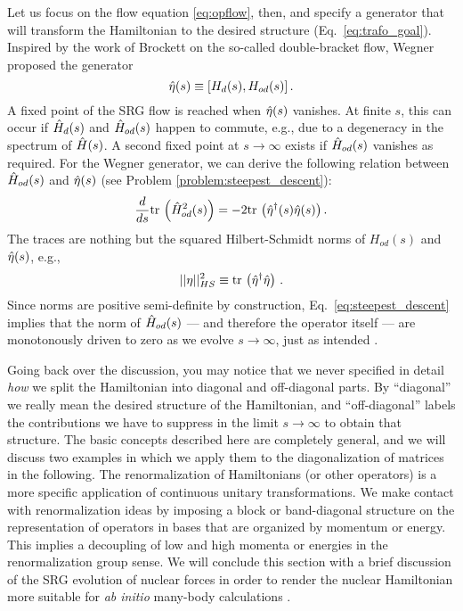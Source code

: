 Let us focus on the flow equation \eqref{eq:opflow}, then, and specify a
generator that will transform the Hamiltonian to the desired structure 
(Eq.~\eqref{eq:trafo_goal}). Inspired by the work of Brockett \cite{Brockett:1991kx} 
on the so-called double-bracket flow, Wegner \cite{Wegner:1994dk} proposed the generator
\begin{equation}\label{eq:def_Wegner_general}
  \etaO(s) \equiv \comm{H_d(s)}{H_{od}(s)}\,.
\end{equation}
A fixed point of the SRG flow is reached when $\hat{\eta}(s)$ vanishes. At finite $s$, this 
can occur if $\hat{H}_d(s)$ and $\hat{H}_{od}(s)$ happen to commute, e.g., due to a degeneracy 
in the spectrum of $\hat{H}(s)$. A second fixed point at $s\to\infty$ exists if $\hat{H}_{od}(s)$ 
vanishes as required. For the Wegner generator, we can derive the following relation
between $\hat{H}_{od}(s)$ and $\hat{\eta}(s)$ (see Problem \ref{problem:steepest_descent}):
\begin{equation} \label{eq:steepest_descent}
  \totd{}{s}\tr\left(\HO^2_{od}(s)\right) = -2 \tr\left(\etaO^\dag(s)\etaO(s)\right).
\end{equation}
The traces are nothing but the squared Hilbert-Schmidt norms of $H_{od}(s)$ and $\hat{\eta}(s)$,
e.g.,
\begin{equation}
  ||\eta||^2_{HS}\equiv\mathrm{tr}\,\left(\hat{\eta}^\dag\hat{\eta}\right)\,.
\end{equation}
Since norms are positive semi-definite by construction, Eq.~\eqref{eq:steepest_descent} 
implies that the norm of $\hat{H}_{od}(s)$ --- and therefore the operator itself --- are monotonously 
driven to zero as we evolve $s\to\infty$, just as intended \cite{Wegner:1994dk,Kehrein:2006kx}.

Going back over the discussion, you may notice that we never specified in
detail \emph{how} we split the Hamiltonian into diagonal and off-diagonal
parts. By ``diagonal'' we really mean the desired structure of the Hamiltonian, 
and ``off-diagonal'' labels the contributions we have to suppress in the
limit $s\to\infty$ to obtain that structure. The basic concepts described
here are completely general, and we will discuss two examples in which we
apply them to the diagonalization of matrices in the following.
The renormalization of Hamiltonians (or other operators) is a more specific 
application of continuous unitary transformations. We make contact with 
renormalization ideas by imposing a block or band-diagonal structure on
the representation of operators in bases that are organized by momentum
or energy. This implies a decoupling of low and high momenta or energies
in the renormalization group sense. We will conclude this section with a
brief discussion of the SRG evolution of nuclear forces in order to render 
the nuclear Hamiltonian more suitable for \emph{ab initio} many-body 
calculations \cite{Bogner:2007od,Bogner:2010pq,Morris:2015ve,Hergert:2016jk,Hergert:2016ng}.


